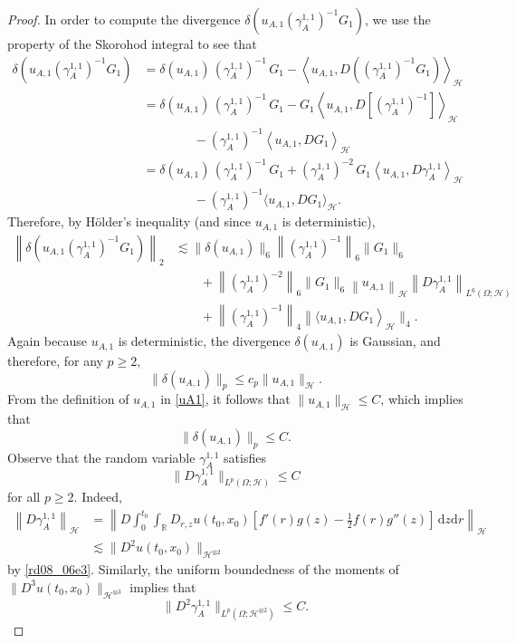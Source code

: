 \documentclass[12pt,a4paper]{article}
\newcommand{\R}{{\mathbb{R}}}
\newcommand{\HH}{\mathcal{H}}
\renewcommand{\d}{\mathrm{d}}
\newcommand{\<}{\langle}
\renewcommand{\>}{\rangle}
\begin{document}
\begin{proof}
In order to compute the divergence  $\delta( u_{A,1}
  (\gamma_A^{1,1})^{-1}    G_1)$, we use the property \cite[Proposition 1.3.3]{nualart2006} of the Skorohod integral to see that
\begin{align*}
   \delta( u_{A,1} (\gamma_A^{1,1})^{-1}  G_1) &=  \delta(u_{A,1})\, (\gamma_A^{1,1})^{-1}\,  G_1 - \left\langle u_{A,1}, D((\gamma_A^{1,1})^{-1}  G_1) \right\rangle_\HH \\
     & = \delta(u_{A,1})\, (\gamma_A^{1,1})^{-1}\,  G_1
  - G_1 \left\langle u_{A,1} ,D\left[(\gamma_A^{1,1})^{-1}\right]  \right\rangle_\HH \\
   &\qquad \qquad- (\gamma_A^{1,1})^{-1} \left\langle u_{A,1} ,D G_1 \right\rangle_\HH\\
  &= \delta(u_{A,1})\, (\gamma_A^{1,1})^{-1}\,  G_1
  + (\gamma_A^{1,1})^{-2}\, G_1\left\langle u_{A,1} ,D\gamma_A^{1,1}  \right\rangle_\HH \\
   &\qquad\qquad - (\gamma_A^{1,1})^{-1} \langle u_{A,1} ,D G_1 \rangle_\HH.
  \end{align*}
  Therefore, by H\"older's inequality (and since $u_{A,1}$ is deterministic),
  \begin{align} \nonumber
  \left\| \delta( u_{A,1}
  (\gamma_A^{1,1})^{-1}    G_1)\right\|_2 &\lesssim  \| \delta(u_{A,1})\|_6 \left \| (\gamma_A^{1,1})^{-1} \right\|_6\| G_1\|_6 \\  \nonumber
  &\qquad + \left\| (\gamma_A^{1,1})^{-2} \right\|_6\| G_1\|_6 \left\| u_{A,1} \right\|_\HH \left\| D\gamma_A^{1,1}\right\|_{L^6(\Omega; \HH)}\\ 
  & \qquad  + \left\| (\gamma_A^{1,1})^{-1} \right\|_4 \left\| \langle u_{A,1} ,D G_1 \right\rangle_\HH\|_4.
 \label{for16}
  \end{align}
 Again because $u_{A,1}$ is deterministic, the divergence $\delta(u_{A,1})$ is Gaussian, and therefore, for any $p\ge 2$,
 \[
  \|\delta(u_{A,1})\|_p \le c_p \| u_{A,1}\|_\HH.
  \]
  From the definition of $u_{A,1}$ in \eqref{uA1}, it follows that $\| u_{A,1}\|_\HH \le C$, which implies that
  \begin{equation} \label{for12}
   \|\delta(u_{A,1})\|_p \le C.
  \end{equation}
  Observe that the random variable $\gamma^{1,1}_A$ satisfies
  \begin{equation} \label{for20}
  \|  D\gamma_A^{1,1}\|_{L^p(\Omega;\HH)} \le C
  \end{equation}
  for all $p\ge 2$. Indeed,
  \begin{align*}
   \left\|  D\gamma_A^{1,1} \right\|_\HH &=  \left\| D \int_0^{t_0} \int_\R D_{r,z} u(t_0,x_0) [ f'(r)g(z)-\frac 12 f(r)g''(z)] \, \d z \d r \right\|_\HH\\
  &\lesssim \| D^2u(t_0,x_0)\|_{\HH^{\otimes2} }
  \end{align*}
by \eqref{rd08_06e3}.   Similarly, the uniform boundedness of the moments of $ \| D^3u(t_0,x_0)\|_{\HH^{\otimes3}}$ implies that
    \begin{equation} \label{for202}
  \|  D^2\gamma_A^{1,1}\|_{L^p(\Omega;\HH^{\otimes 2})} \le C.
  \end{equation}


\end{proof}
\end{document}

